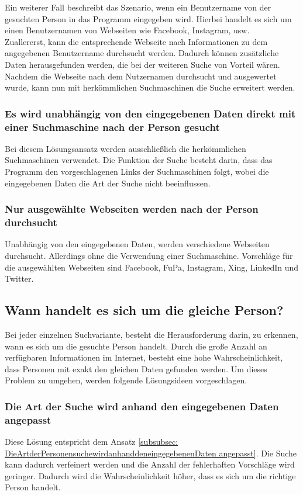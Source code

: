 		Ein weiterer Fall beschreibt das Szenario, wenn ein Benutzername von der gesuchten Person in das Programm eingegeben wird. Hierbei handelt es sich um einen Benutzernamen von Webseiten wie Facebook, Instagram, usw.\\
		Zuallererst, kann die entsprechende Webseite nach Informationen zu dem angegebenen Benutzername durchsucht werden. Dadurch können zusätzliche Daten herausgefunden werden, die bei der weiteren Suche von Vorteil wären. \\
		Nachdem die Webseite nach dem Nutzernamen durchsucht und ausgewertet wurde, kann nun mit herkömmlichen Suchmaschinen die Suche erweitert werden.
		\subsubsection{Es wird unabhängig von den eingegebenen Daten direkt mit einer Suchmaschine nach der Person gesucht}
		Bei diesem Lösungsansatz werden ausschließlich die herkömmlichen Suchmaschinen verwendet. Die Funktion der Suche besteht darin, dass das Programm den vorgeschlagenen Links der Suchmaschinen folgt, wobei die eingegebenen Daten die Art der Suche nicht beeinflussen.
		\subsubsection{Nur ausgewählte Webseiten werden nach der Person durchsucht}
		Unabhängig von den eingegebenen Daten, werden verschiedene Webseiten durchsucht. Allerdings ohne die Verwendung einer Suchmaschine. Vorschläge für die ausgewählten Webseiten sind Facebook, FuPa, Instagram, Xing, LinkedIn und Twitter.
	
	\subsection{Wann handelt es sich um die gleiche Person?}
	Bei jeder einzelnen Suchvariante, besteht die Herausforderung darin, zu erkennen, wann es sich um die gesuchte Person handelt. Durch die große Anzahl an verfügbaren Informationen im Internet, besteht eine hohe Wahrscheinlichkeit, dass Personen mit exakt den gleichen Daten gefunden werden. Um dieses Problem zu umgehen, werden folgende Lösungsideen vorgeschlagen.
		\subsubsection{Die Art der Suche wird anhand den eingegebenen Daten angepasst}	Diese Lösung entspricht dem Ansatz \ref{subsubsec: DieArtderPersonensuchewirdanhanddeneingegebenenDaten angepasst}. Die Suche kann dadurch verfeinert werden und die Anzahl der fehlerhaften Vorschläge wird geringer. Dadurch wird die Wahrscheinlichkeit höher, dass es sich um die richtige Person handelt.
